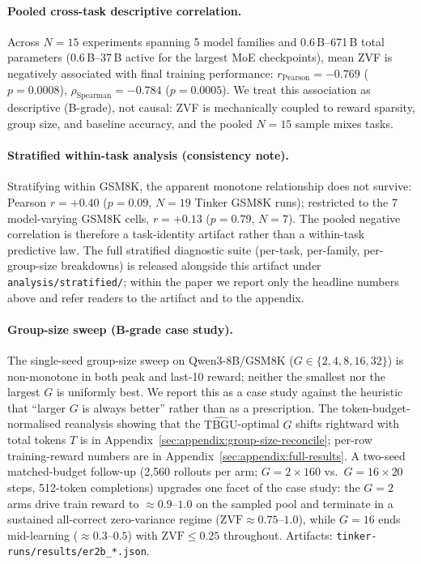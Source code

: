 \documentclass{article}
\begin{document}
\paragraph{Pooled cross-task descriptive correlation.}
Across $N = 15$ experiments spanning 5 model families and
0.6\,B--671\,B total parameters (0.6\,B--37\,B active for the largest
MoE checkpoints), mean ZVF is negatively associated with final training
performance: $r_{\text{Pearson}} = -0.769$ ($p = 0.0008$),
$\rho_{\text{Spearman}} = -0.784$ ($p = 0.0005$).
We treat this association as descriptive (B-grade), not causal: ZVF is
mechanically coupled to reward sparsity, group size, and baseline
accuracy, and the pooled $N{=}15$ sample mixes tasks.

\paragraph{Stratified within-task analysis (consistency note).}
Stratifying within GSM8K, the apparent monotone relationship does not
survive: Pearson $r = +0.40$ ($p = 0.09$, $N{=}19$ Tinker GSM8K runs);
restricted to the 7 model-varying GSM8K cells, $r = +0.13$ ($p = 0.79$,
$N{=}7$). The pooled negative correlation is therefore a task-identity
artifact rather than a within-task predictive law. The full stratified
diagnostic suite (per-task, per-family, per-group-size breakdowns) is
released alongside this artifact under \texttt{analysis/stratified/};
within the paper we report only the headline numbers above and refer
readers to the artifact and to the appendix.

\paragraph{Group-size sweep (B-grade case study).}
The single-seed group-size sweep on Qwen3-8B/GSM8K
($G \in \{2,4,8,16,32\}$) is non-monotone in both peak and last-10
reward; neither the smallest nor the largest $G$ is uniformly best. We
report this as a case study against the heuristic that ``larger $G$ is
always better'' rather than as a prescription. The
token-budget-normalised reanalysis showing that the
$\widehat{\mathrm{TBGU}}$-optimal $G$ shifts rightward with total tokens
$T$ is in Appendix~\ref{sec:appendix:group-size-reconcile}; per-row
training-reward numbers are in Appendix~\ref{sec:appendix:full-results}.
A two-seed matched-budget follow-up (2{,}560 rollouts per arm;
$G{=}2\times160$ vs.\ $G{=}16\times20$ steps, 512-token completions)
upgrades one facet of the case study: the $G{=}2$ arms drive train reward
to $\approx0.9$--$1.0$ on the sampled pool and terminate in a sustained
all-correct zero-variance regime ($\mathrm{ZVF}\approx0.75$--$1.0$),
while $G{=}16$ ends mid-learning ($\approx0.3$--$0.5$) with
$\mathrm{ZVF}\le0.25$ throughout. Artifacts:
\texttt{tinker-runs/results/er2b\_*.json}.
\end{document}
